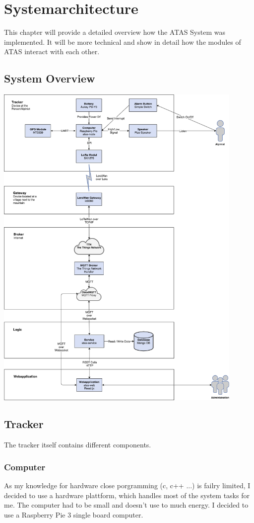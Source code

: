 \documentclass[a4paper,11pt, oneside]{report}
\theoremstyle{definition}
\begin{document}
\chapter{Systemarchitecture}
This chapter will provide a detailed overview how the ATAS System was implemented. It will be more technical and show in detail how the modules of ATAS interact with each other.


\newpage
\noindent
\section{System Overview}
\includegraphics[width=0.9\textwidth]{img/ATAS_SystemOverview_Detail.png}

\newpage
\section{Tracker}
The tracker itself contains different components.

\subsection{Computer}
As my knowledge for hardware close porgramming (c, c++ ...) is failry limited, I decided to use a hardware plattform, which handles most of the system tasks for me. The computer had to be small and doesn't use to much energy. I decided to use a Raspberry Pie 3  single board computer.
\end{document}
